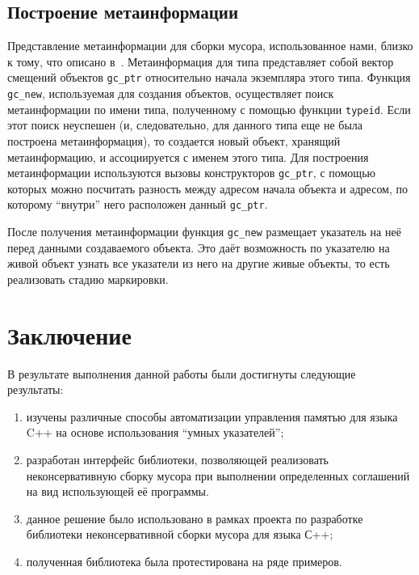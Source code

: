 \subsection{Построение метаинформации}

Представление метаинформации для сборки мусора, использованное нами, близко к тому, что описано
в~\cite{meta}. Метаинформация для типа представляет собой вектор смещений объектов \lstinline{gc_ptr} 
относительно начала экземпляра этого типа. Функция \lstinline{gc_new}, используемая для создания объектов, 
осуществляет поиск метаинформации по имени типа, полученному с помощью функции \lstinline{typeid}. 
Если этот поиск неуспешен (и, следовательно, для данного типа еще не была построена метаинформация), 
то создается новый объект, хранящий метаинформацию, и ассоциируется с именем этого типа. Для построения
метаинформации используются вызовы конструкторов \lstinline{gc_ptr}, с помощью которых можно
посчитать разность между адресом начала объекта и адресом, по которому ``внутри'' него расположен данный
\lstinline{gc_ptr}. 

После получения метаинформации функция \lstinline{gc_new} размещает указатель на неё перед данными 
создаваемого объекта. Это даёт возможность по указателю на живой объект узнать все указатели
из него на другие живые объекты, то есть реализовать стадию маркировки.

\section*{Заключение}

В результате выполнения данной работы были достигнуты следующие результаты:

\begin{enumerate}
\item изучены различные способы автоматизации управления памятью для языка C++ на 
основе использования ``умных указателей'';

\item разработан интерфейс библиотеки, позволяющей реализовать неконсервативную сборку мусора
при выполнении определенных соглашений на вид использующей её программы.

\item данное решение было использовано в рамках проекта по разработке библиотеки неконсервативной 
сборки мусора для языка С++;

\item полученная библиотека была протестирована на ряде примеров.
\end{enumerate}


